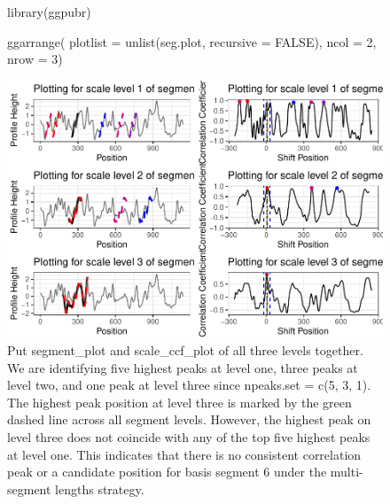 \begin{figure}
\vspace{1em}
\begin{adjustbox}{valign=t}
\begin{minipage}{.39\textwidth}

{\small {}
\begin{Schunk}
\begin{Sinput}
library(ggpubr)

ggarrange(
  plotlist = 
    unlist(seg.plot, 
           recursive = FALSE),
  ncol = 2, 
  nrow = 3)
\end{Sinput}
\end{Schunk}
}
\vspace{1em}
\end{minipage}
\begin{minipage}{.59\textwidth}
\includegraphics[width=\textwidth]{ju-hofmann_files/figure-latex/segplot3-1.pdf}
\end{minipage}
\end{adjustbox}
\caption{\label{fig:seg_all} Put segment\_plot and scale\_ccf\_plot of all three levels together. We are identifying five highest peaks at level one, three peaks at level two, and one peak at level three since npeaks.set = c(5, 3, 1). The highest peak position at level three is marked by the green dashed line across all segment levels. However, the highest peak on level three does not coincide with any of the top five highest peaks at level one. This indicates that there is no consistent correlation peak or a candidate position for basis segment 6 under the multi-segment lengths strategy.}
\end{figure}

